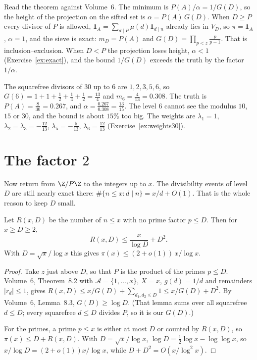 Read the theorem against Volume~6. The minimum is $P(A)/\alpha=1/G(D)$, so the height of the projection on the sifted set is $\alpha=P(A)\,G(D)$. When $D\ge P$ every divisor of $P$ is allowed, $\mathbf 1_A=\sum_{d\mid P}\mu(d)\mathbf 1_{d\mid n}$ already lies in $V_D$, so $\pi=\mathbf 1_A$, $\alpha=1$, and the sieve is exact: $m_D=P(A)$ and $G(D)=\prod_{p<z}\frac p{p-1}$. That is inclusion--exclusion. When $D<P$ the projection loses height, $\alpha<1$ (Exercise~\ref{ex:exact}), and the bound $1/G(D)$ exceeds the truth by the factor $1/\alpha$.

\begin{examplex}[$z=6$, $P=30$, $D=6$]
The squarefree divisors of $30$ up to $6$ are $1,2,3,5,6$, so $G(6)=1+1+\frac12+\frac14+\frac12=\frac{13}4$ and $m_6=\frac4{13}=0.308$. The truth is $P(A)=\frac8{30}=0.267$, and $\alpha=\frac{0.267}{0.308}=\frac{13}{15}$. The level $6$ cannot see the modulus $10$, $15$ or $30$, and the bound is about $15\%$ too big. The weights are $\lambda_1=1$, $\lambda_2=\lambda_3=-\frac{12}{13}$, $\lambda_5=-\frac5{13}$, $\lambda_6=\frac{12}{13}$ (Exercise~\ref{ex:weights30}).
\end{examplex}

\section{The factor \texorpdfstring{$2$}{2}}

Now return from $\Z/P\Z$ to the integers up to $x$. The divisibility events of level $D$ are still nearly exact there: $\#\{n\le x:d\mid n\}=x/d+O(1)$. That is the whole reason to keep $D$ small.

\begin{corollary}\label{cor:selbergtwo}
Let $R(x,D)$ be the number of $n\le x$ with no prime factor $p\le D$. Then for $x\ge D\ge2$,
\[
R(x,D)\le\frac x{\log D}+D^2.
\]
With $D=\sqrt x/\log x$ this gives $\pi(x)\le(2+o(1))\,x/\log x$.
\end{corollary}
\begin{proof}
Take $z$ just above $D$, so that $P$ is the product of the primes $p\le D$. Volume~6, Theorem~8.2 with $\mathcal A=\{1,\dots,x\}$, $X=x$, $g(d)=1/d$ and remainders $|r_d|\le1$, gives $R(x,D)\le x/G(D)+\sum_{d_1,d_2\le D}1\le x/G(D)+D^2$. By Volume~6, Lemma~8.3, $G(D)\ge\log D$. (That lemma sums over all squarefree $d\le D$; every squarefree $d\le D$ divides $P$, so it is our $G(D)$.)

For the primes, a prime $p\le x$ is either at most $D$ or counted by $R(x,D)$, so $\pi(x)\le D+R(x,D)$. With $D=\sqrt x/\log x$, $\log D=\frac12\log x-\log\log x$, so $x/\log D=(2+o(1))x/\log x$, while $D+D^2=O(x/\log^2x)$.
\end{proof}

